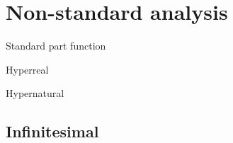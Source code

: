 \chapter{Non-standard analysis}

Standard part function

Hyperreal

Hypernatural

\section{Infinitesimal}
